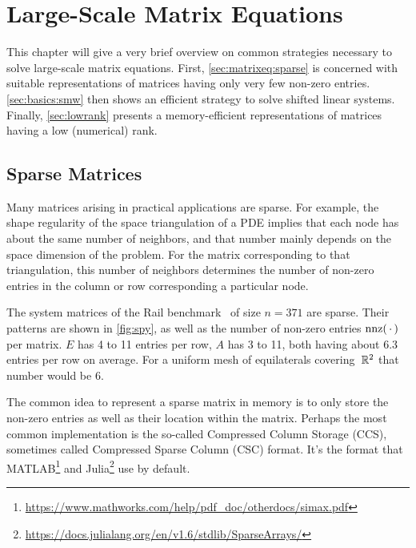 \chapter{Large-Scale Matrix Equations}
\label{sec:matrixeq}

This chapter will give a very brief overview on common strategies necessary to solve large-scale matrix equations.
First, \autoref{sec:matrixeq:sparse} is concerned with suitable representations of matrices having only very few non-zero entries.
\autoref{sec:basics:smw} then shows an efficient strategy to solve shifted linear systems.
Finally, \autoref{sec:lowrank} presents a memory-efficient representations of matrices having a low (numerical) rank.

\section{Sparse Matrices}
\label{sec:matrixeq:sparse}

Many matrices arising in practical applications are sparse.
For example, the shape regularity of the space triangulation of a \ac{PDE}
implies that each node has about the same number of neighbors,
and that number mainly depends on the space dimension of the problem.
For the matrix corresponding to that triangulation,
this number of neighbors determines the number of non-zero entries in the column or row corresponding a particular node.

\begin{example}
  The system matrices of the Rail benchmark~\cite{morwiki_steel} of size $n=371$ are sparse.
  Their patterns are shown in \autoref{fig:spy}, as well as the number of non-zero entries $\nnz(\optional{})$ per matrix.
  $E$ has 4 to 11 entries per row, $A$ has 3 to 11, both having about \num{6.3} entries per row on average.
  For a uniform mesh of equilaterals covering~$\mathbb{R}^2$ that number would be \num{6}.
\end{example}

The common idea to represent a sparse matrix in memory is to only store the non-zero entries as well as their location within the matrix.
Perhaps the most common implementation is the so-called Compressed Column Storage (CCS),
sometimes called Compressed Sparse Column (CSC) format.
It's the format that \eg MATLAB\footnote{\url{https://www.mathworks.com/help/pdf_doc/otherdocs/simax.pdf}}
and Julia\footnote{\url{https://docs.julialang.org/en/v1.6/stdlib/SparseArrays/}} use by default.

